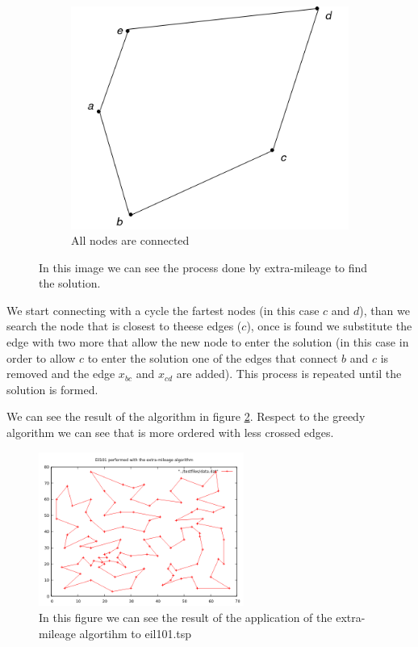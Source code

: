 \begin{figure}
\begin{subfigure}{0.3\textwidth}
		\includegraphics[width=\textwidth]{images/extra_5}
		\caption{All nodes are connected}
	\end{subfigure}
	\caption{In this image we can see the process done by extra-mileage to find the solution.}
	\label{img:extra}
\end{figure}

We start connecting with a cycle the fartest nodes (in this case $c$ and $d$), than we search the node that is closest to theese edges ($c$), once is found we substitute the edge with two more that allow the new node to enter the solution (in this case in order to allow $c$ to enter the solution one of the edges that connect $b$ and $c$ is removed and the edge $x_{bc}$ and $x_{cd}$ are added). This process is repeated until the solution is formed.

We can see the result of the algorithm in figure \ref{img:extra_sol}. Respect to the greedy algorithm we can see that is more ordered with less crossed edges.

\begin{figure}
	\centering
	\includegraphics[width=0.6\textwidth]{images/eil101_extra_mileage}
	\caption{In this figure we can see the result of the application of the extra-mileage algortihm to eil101.tsp}
	\label{img:extra_sol}
\end{figure}